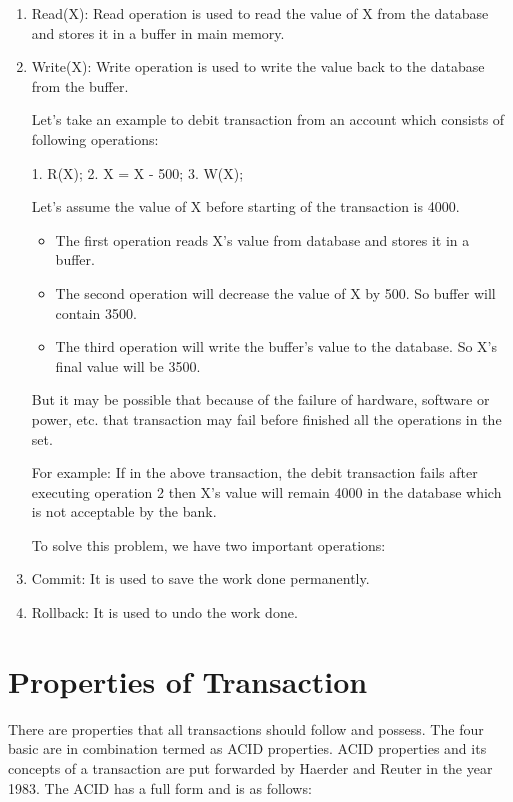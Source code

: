 \documentclass{article}
\begin{document}
\begin{enumerate}


\item Read(X): Read operation is used to read the value of X from the database and stores it in a buffer in main memory.

\item Write(X): Write operation is used to write the value back to the database from the buffer.

Let's take an example to debit transaction from an account which consists of following operations:

1.  R(X);  
2.  X = X - 500;  
3.  W(X);  

Let's assume the value of X before starting of the transaction is 4000.
\begin{itemize}

\item The first operation reads X's value from database and stores it in a buffer.
\item The second operation will decrease the value of X by 500. So buffer will contain 3500.
\item The third operation will write the buffer's value to the database. So X's final value will be 3500.
\end{itemize}

But it may be possible that because of the failure of hardware, software or power, etc. that transaction may fail before finished all the operations in the set.

For example: If in the above transaction, the debit transaction fails after executing operation 2 then X's value will remain 4000 in the database which is not acceptable by the bank.

To solve this problem, we have two important operations:

\item Commit: It is used to save the work done permanently.

\item Rollback: It is used to undo the work done.

\end{enumerate}

\section{Properties of Transaction}

There are properties that all transactions should follow and possess. The four basic are in combination termed as ACID properties. ACID properties and its concepts of a transaction are put forwarded by Haerder and Reuter in the year 1983. The ACID has a full form and is as follows:
\end{document}
